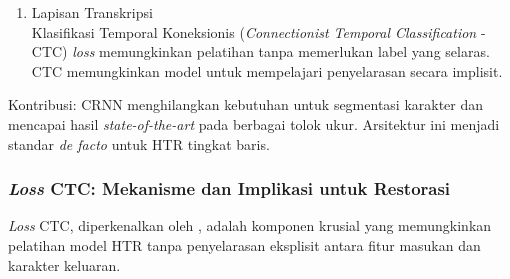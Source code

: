 \begin{enumerate}[leftmargin=*, labelindent=0pt, itemsep=1ex, topsep=0pt]
\begin{enumerate}[leftmargin=1.5em, labelsep=0.5em, itemindent=0pt, label=\alph*., topsep=0pt, parsep=0pt, itemsep=0pt]
      \item Lapisan Transkripsi \mbox{}\\[0.1em]
            Klasifikasi Temporal Koneksionis (\textit{Connectionist Temporal Classification} - CTC) \textit{loss} memungkinkan pelatihan tanpa memerlukan label yang selaras. CTC memungkinkan model untuk mempelajari penyelarasan secara implisit.
\end{enumerate}

Kontribusi: CRNN menghilangkan kebutuhan untuk segmentasi karakter dan mencapai hasil \textit{state-of-the-art} pada berbagai tolok ukur. Arsitektur ini menjadi standar \textit{de facto} untuk HTR tingkat baris.

\end{enumerate}

\subsubsection{\textit{Loss} CTC: Mekanisme dan Implikasi untuk Restorasi}
\label{subsubsec:ctc-loss}

\textit{Loss} CTC, diperkenalkan oleh \parencite{graves2006}, adalah komponen krusial yang memungkinkan pelatihan model HTR tanpa penyelarasan eksplisit antara fitur masukan dan karakter keluaran.

